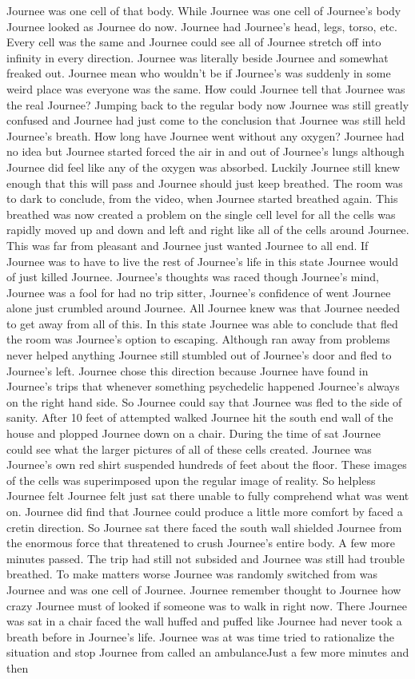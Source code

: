 \documentclass[12pt]{book}
\begin{document}
Journee was one cell of that body. While Journee was one cell of Journee's body Journee looked as Journee do now. Journee had Journee's head, legs, torso, etc. Every cell was the same and Journee could see all of Journee stretch off into infinity in every direction. Journee was literally beside Journee and somewhat freaked out. Journee mean who wouldn't be if Journee's was suddenly in some weird place was everyone was the same. How could Journee tell that Journee was the real Journee? Jumping back to the regular body now Journee was still greatly confused and Journee had just come to the conclusion that Journee was still held Journee's breath. How long have Journee went without any oxygen? Journee had no idea but Journee started forced the air in and out of Journee's lungs although Journee did feel like any of the oxygen was absorbed. Luckily Journee still knew enough that this will pass and Journee should just keep breathed. The room was to dark to conclude, from the video, when Journee started breathed again. This breathed was now created a problem on the single cell level for all the cells was rapidly moved up and down and left and right like all of the cells around Journee. This was far from pleasant and Journee just wanted Journee to all end. If Journee was to have to live the rest of Journee's life in this state Journee would of just killed Journee. Journee's thoughts was raced though Journee's mind, Journee was a fool for had no trip sitter, Journee's confidence of went Journee alone just crumbled around Journee. All Journee knew was that Journee needed to get away from all of this. In this state Journee was able to conclude that fled the room was Journee's option to escaping. Although ran away from problems never helped anything Journee still stumbled out of Journee's door and fled to Journee's left. Journee chose this direction because Journee have found in Journee's trips that whenever something psychedelic happened Journee's always on the right hand side. So Journee could say that Journee was fled to the side of sanity. After 10 feet of attempted walked Journee hit the south end wall of the house and plopped Journee down on a chair. During the time of sat Journee could see what the larger pictures of all of these cells created. Journee was Journee's own red shirt suspended hundreds of feet about the floor. These images of the cells was superimposed upon the regular image of reality. So helpless Journee felt Journee felt just sat there unable to fully comprehend what was went on. Journee did find that Journee could produce a little more comfort by faced a cretin direction. So Journee sat there faced the south wall shielded Journee from the enormous force that threatened to crush Journee's entire body. A few more minutes passed. The trip had still not subsided and Journee was still had trouble breathed. To make matters worse Journee was randomly switched from was Journee and was one cell of Journee. Journee remember thought to Journee how crazy Journee must of looked if someone was to walk in right now. There Journee was sat in a chair faced the wall huffed and puffed like Journee had never took a breath before in Journee's life. Journee was at was time tried to rationalize the situation and stop Journee from called an ambulanceJust a few more minutes and then 
\end{document}
